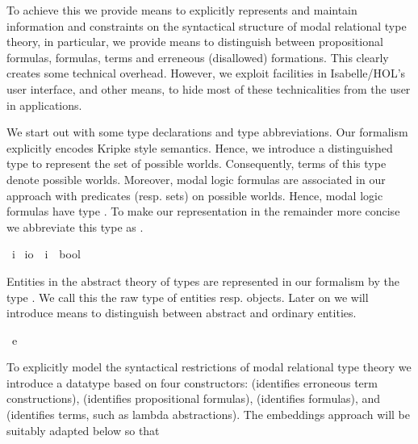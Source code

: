 \begin{isabellebody}
\begin{isamarkuptext}
 To achieve this  we provide means to explicitly represents and maintain information and constraints on the 
 syntactical structure of modal relational type theory, in particular, we provide means to distinguish 
 between propositional formulas, formulas, terms and erreneous (disallowed) formations. 
 This clearly creates some technical overhead. However, we exploit facilities in Isabelle/HOL's user 
 interface, and other means, to hide most of these technicalities from the user in applications.%
\end{isamarkuptext}%
\isamarkuptrue%
%
\isamarkuptrue%
%
\begin{isamarkuptext}%
We start out with some type declarations and type abbreviations. 
 Our formalism explicitly encodes Kripke style semantics. Hence, we introduce a 
 distinguished type  to represent the set of possible worlds. 
 Consequently, terms of this type denote possible worlds. 
 Moreover, modal logic formulas are associated in our approach with
 predicates (resp. sets) on possible worlds. Hence, modal logic formulas have
 type . To make our representation in the remainder more concise
 we abbreviate this type as .%
\end{isamarkuptext}%
\isamarkuptrue%
\isamarkupfalse%
\ i\isanewline
{}\isamarkupfalse%
\ io\ {\isacharequal}\ {\isachardoublequoteopen}{\isacharparenleft}i\ {\isasymRightarrow}\ bool{\isacharparenright}{\isachardoublequoteclose}%
\begin{isamarkuptext}%
Entities in the abstract theory of types are represented in our formalism by the
 type . We call this the raw type of entities resp. objects. Later 
 on we will introduce means to distinguish between abstract and ordinary entities.%
\end{isamarkuptext}%
\isamarkuptrue%
\isamarkupfalse%
\ e%
\begin{isamarkuptext}%
To explicitly model the syntactical restrictions of modal relational type theory we introduce a 
 datatype  based on four constructors:
  (identifies erroneous term constructions),  (identifies 
 propositional formulas),  (identifies  formulas), and  (identifies 
 terms, such as lambda abstractions). The embeddings approach will be suitably adapted below so that 

\end{isamarkuptext}
\end{isabellebody}
